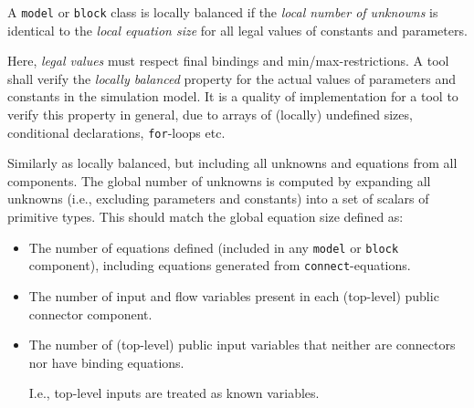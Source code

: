 \begin{definition}
A \lstinline!model! or \lstinline!block! class is locally balanced if the \emph{local number of unknowns} is identical to the \emph{local equation size} for all legal values of constants and parameters.
\end{definition}

\begin{nonnormative}
Here, \emph{legal values} must respect final bindings and min/max-restrictions.
A tool shall verify the \emph{locally balanced} property for the actual values of parameters and constants in the simulation model.
It is a quality of implementation for a tool to verify this property in general, due to arrays of (locally) undefined sizes, conditional declarations, \lstinline!for!-loops etc.
\end{nonnormative}

\begin{definition}
Similarly as locally balanced, but including all unknowns and equations
from all components. The global number of unknowns is computed by
expanding all unknowns (i.e., excluding parameters and constants) into a
set of scalars of primitive types. This should match the global equation
size defined as:
\begin{itemize}
\item
  The number of equations defined (included in any \lstinline!model! or \lstinline!block! component), including equations generated from \lstinline!connect!-equations.
\item
  The number of input and flow variables present in each (top-level) public connector component.
\item
  The number of (top-level) public input variables that neither are connectors nor have binding equations.
  \begin{nonnormative}
  I.e., top-level inputs are treated as known variables.
  \end{nonnormative}
\end{itemize}
\end{definition}


